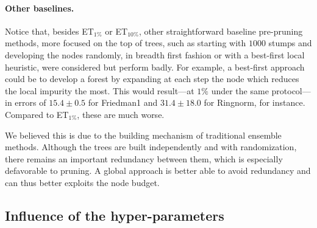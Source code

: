 \documentclass{article}
\begin{document}
\paragraph{Other baselines.}

Notice that, besides ET$_{1\%}$ or ET$_{10\%}$, other straightforward baseline
pre-pruning methods, more focused on the top of trees, such as starting with
$1000$ stumps and developing the nodes randomly, in breadth first fashion or
with a best-first local heuristic, were considered but perform badly. For 
example, a best-first approach could be to develop a forest by expanding at 
each step the node which reduces the local impurity the most. This would 
result---at $1\%$ under the same protocol---in errors of $15.4 \pm 0.5$ for 
Friedman1 and $31.4 \pm 18.0$ for Ringnorm, for instance. Compared to 
ET$_{1\%}$, these are much worse.

We believed this is due to the building mechanism of traditional ensemble 
methods. Although the trees are built independently and with randomization, 
there remains an important redundancy between them, which is especially 
defavorable to pruning. A global approach is better able to avoid redundancy 
and can thus better exploits the node budget.

\subsection{Influence of the hyper-parameters}
\label{subsec:hyperparams}


\end{document}
